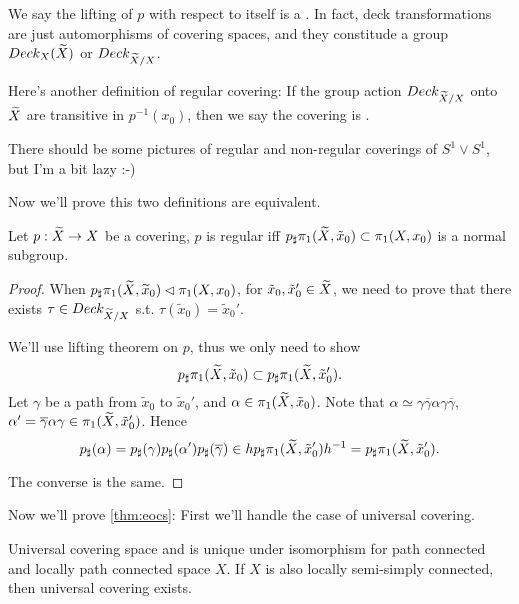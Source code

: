We say the lifting of $p$ with respect to itself is a .
In fact, deck transformations are just automorphisms of covering spaces,
and they constitude a group $Deck_X(\widetilde{X})$ or $Deck_{\widetilde{X} / X}$.

Here's another definition of regular covering:
If the group action $Deck_{\widetilde{X}/X}$ onto $\widetilde{X}$ are transitive in $p^{-1}(x_0)$,
then we say the covering is .

There should be some pictures of regular and non-regular coverings
of $S^1\vee S^1$, but I'm a bit lazy :-)

Now we'll prove this two definitions are equivalent.
\begin{proposition}
	Let $p: \widetilde{X} \to X$ be a covering, $p$ is regular
	iff $p_\sharp \pi_1(\widetilde{X}, \tilde x_0) \subset \pi_1(X, x_0)$ is a
	normal subgroup.
\end{proposition}
\begin{proof}[Proof]
    When $p_\sharp \pi_1(\widetilde{X}, \widetilde{x}_0) \lhd \pi_1(X, x_0)$,
	for $\tilde x_0, \tilde x'_0 \in \widetilde{X}$, we need to prove that
	there exists $\tau\in Deck_{\widetilde{X}/X}$ s.t. $\tau(\tilde x_0) = \tilde x_0'$.

	We'll use lifting theorem on $p$,
	thus we only need to show
	\[
		p_\sharp\pi_1(\widetilde{X}, \tilde x_0) \subset p_\sharp \pi_1(\widetilde{X}, \tilde x_0').
	\]
	Let $\gamma$ be a path from $\tilde x_0$ to $\tilde x_0'$,
	and $\alpha\in \pi_1(\widetilde{X}, \tilde x_0)$.
	Note that $\alpha \simeq \gamma \overline{\gamma}\alpha\gamma \overline{\gamma}$,
	$\alpha' = \overline{\gamma} \alpha \gamma\in \pi_1(\widetilde{X}, \tilde x_0')$.
	Hence
	\[
	p_\sharp(\alpha) = p_\sharp(\gamma)p_\sharp(\alpha')p_\sharp(\overline{\gamma})
	\in h p_\sharp\pi_1(\widetilde{X}, \tilde x_0') h^{-1}
	= p_\sharp\pi_1(\widetilde{X}, \tilde x_0').
	\]

	The converse is the same.
\end{proof}

Now we'll prove \autoref{thm:eocs}:
First we'll handle the case of universal covering.
\begin{theorem}
    Universal covering space and is unique under isomorphism
	for path connected and locally path connected space $X$.
	If $X$ is also locally semi-simply connected, then universal covering exists.
\end{theorem}
